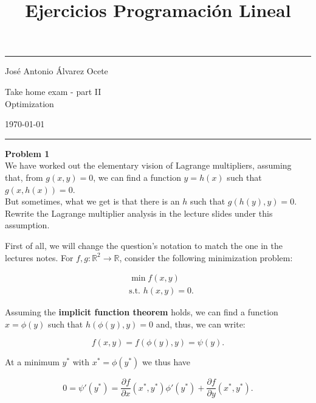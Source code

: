 \documentclass[11pt,table]{article}
\title{Ejercicios Programación Lineal}
\newcommand{\R}{\mathbb{R}}
\newenvironment{problem}[2][Problem]
{ \begin{mdframed}[backgroundcolor=gray!20] \textbf{#1 #2} \\ }
	{  \end{mdframed} }
\begin{document}
	
	
	\fancyhead[C]{}
	\hrule \medskip %
	\begin{minipage}{0.295\textwidth}
		\raggedright
		\footnotesize
		José Antonio Álvarez Ocete \hfill\\
	\end{minipage}
	\begin{minipage}{0.4\textwidth}
		\centering
		\large
		Take home exam - part II\\
		\normalsize
		Optimization\\
	\end{minipage}
	\begin{minipage}{0.295\textwidth}
		\raggedleft
		\today\hfill\\
	\end{minipage}
	\medskip\hrule
	\bigskip
	
	
	
	\begin{problem}{1}
		We have worked out the elementary vision of Lagrange multipliers, assuming that, from \(g(x,y) = 0\), we can find a function \(y = h(x)\) such that \(g(x,h(x)) = 0\).\\
		
		But sometimes, what we get is that there is an \(h\) such that \(g(h(y),y) = 0\). Rewrite the Lagrange multiplier analysis in the lecture slides under this assumption.
	\end{problem}
	
	First of all, we will change the question's notation to match the one in the lectures notes. For $f,g:\R^2 \rightarrow \R$, consider the following minimization problem:
	
	\begin{align*}
		& \min f(x,y)\\
		& \text{s.t. } h(x,y) = 0 .
	\end{align*}
	
	Assuming the \textbf{implicit function theorem} holds, we can find a function $x = \phi(y)$ such that $h(\phi(y), y) = 0$ and, thus, we can write:
	
	\[
	f(x,y) = f(\phi(y), y) = \psi(y).
	\]
	
	At a minimum $y^*$ with $x^* = \phi(y^*)$ we thus have
	
	\begin{equation}
		\label{eq1-1}
		0 = \psi'(y^*) = \frac{\partial f}{\partial x}(x^*, y^*)\phi'(y^*) + \frac{\partial f}{\partial y}(x^*, y^*).
	\end{equation}
	
\end{document}

